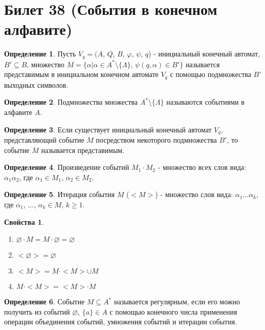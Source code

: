 \documentclass[a4paper, 12pt]{article}
\renewcommand{\phi}{\varphi}
\theoremstyle{definition}
\newtheorem*{definition}{Определение}
\theoremstyle{plain}
\newtheorem*{properties}{Свойства}
\theoremstyle{remark}
\begin{document}
  \section{Билет 38 (События в конечном алфавите)}
  \begin{definition}
    Пусть $V_q=(A$, $Q$, $B$, $\phi$, $\psi$, $q$) - инициальный конечный автомат, $B'\subseteq B$, множество $M=\{\alpha|\alpha\in A^*\setminus\{\Lambda\}$, $\psi(q,\alpha)\in B'\}$ называется представимым в инициальном конечном автомате $V_q$ с помощью подмножества $B'$ выходных символов.
  \end{definition}
  \begin{definition}
    Подмножества множества $A^*\setminus\{\Lambda\}$ называются событиями в алфавите $A$.
  \end{definition}
  \begin{definition}
    Если существует инициальный конечный автомат $V_q$, представляющий событие $M$ посредством некоторого подмножества $B'$, то событие $M$ называется представимым.
  \end{definition}
  \begin{definition}
    Произведение событий $M_1\cdot M_2$ - множество всех слов вида: $\alpha_1\alpha_2$, где $\alpha_1\in M_1$, $\alpha_2\in M_2$.
  \end{definition}
  \begin{definition}
    Итерация события $M$ ($<M>$) - множество слов вида: $\alpha_1\ldots\alpha_k$, где $\alpha_1$, $\ldots$, $\alpha_k\in M$, $k\geqslant1$.
  \end{definition}
  \begin{properties}
    \begin{enumerate}
      \item $\varnothing\cdot M=M\cdot\varnothing=\varnothing$
      \item $<\varnothing>=\varnothing$
      \item $<M>=M\cdot<M>\cup M$
      \item $M\cdot<M>=<M>\cdot M$
    \end{enumerate}
  \end{properties}
  \begin{definition}
    Событие $M\subseteq A^*$ называется регулярным, если его можно получить из событий $\varnothing$, $\{a\}\in A$ с помощью конечного числа применения операции объединения событий, умножения событий и итерации события.
  \end{definition}
\end{document}

